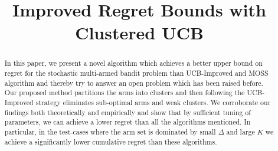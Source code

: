 \documentclass[11pt,letterpaper,english]{article}
\begin{document}
\title{Improved Regret Bounds with Clustered UCB}

\author{}


\renewcommand\Authands{ and }

\date{}

\maketitle

\begin{abstract}
In this paper, we present a novel algorithm which achieves a better upper bound on regret for the stochastic multi-armed bandit problem than UCB-Improved and MOSS algorithm and thereby try to answer an open problem which has been raised before. Our proposed method partitions the arms into clusters and then following the UCB-Improved strategy eliminates sub-optimal arms and weak clusters. We corroborate our findings both theoretically and empirically and show that by sufficient tuning of parameters, we can achieve a lower regret than all the algorithms mentioned. In particular, in the test-cases where the arm set is dominated by small $\Delta$ and large $K$ we achieve a significantly lower cumulative regret than these algorithms.




\end{abstract}
\end{document}
